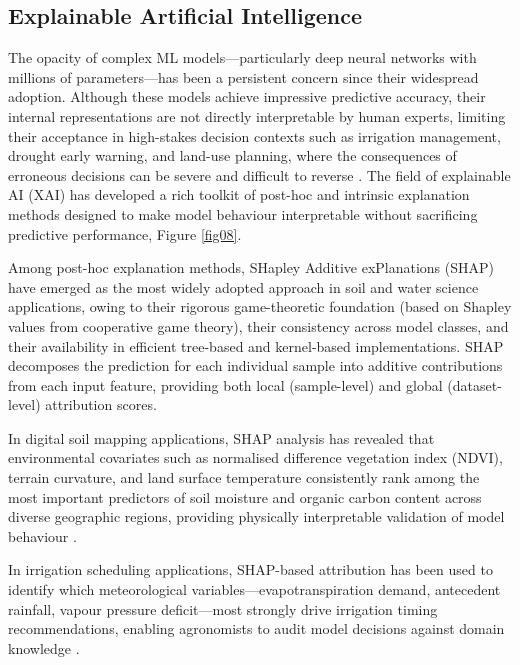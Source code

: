 \documentclass[land,article,submit,pdftex,moreauthors]{Definitions/mdpi}
\numberwithin{equation}{section}
\begin{document}
\subsection{Explainable Artificial Intelligence}

The opacity of complex ML models---particularly deep neural networks with millions of parameters---has been a persistent concern since their widespread adoption. Although these models achieve impressive predictive accuracy, their internal representations are not directly interpretable by human experts, limiting their acceptance in high-stakes decision contexts such as irrigation management, drought early warning, and land-use planning, where the consequences of erroneous decisions can be severe and difficult to reverse \citep{arrieta2020explainable}. The field of explainable AI (XAI) has developed a rich toolkit of post-hoc and intrinsic explanation methods designed to make model behaviour interpretable without sacrificing predictive performance, Figure \ref{fig08}.

Among post-hoc explanation methods, SHapley Additive exPlanations (SHAP) \citep{lundberg2017unified} have emerged as the most widely adopted approach in soil and water science applications, owing to their rigorous game-theoretic foundation (based on Shapley values from cooperative game theory), their consistency across model classes, and their availability in efficient tree-based and kernel-based implementations. SHAP decomposes the prediction for each individual sample into additive contributions from each input feature, providing both local (sample-level) and global (dataset-level) attribution scores. 

In digital soil mapping applications, SHAP analysis has revealed that environmental covariates such as normalised difference vegetation index (NDVI), terrain curvature, and land surface temperature consistently rank among the most important predictors of soil moisture and organic carbon content across diverse geographic regions, providing physically interpretable validation of model behaviour \citep{padarian2019using}. 

In irrigation scheduling applications, SHAP-based attribution has been used to identify which meteorological variables---evapotranspiration demand, antecedent rainfall, vapour pressure deficit---most strongly drive irrigation timing recommendations, enabling agronomists to audit model decisions against domain knowledge \citep{zhou2023xai}.
\end{document}
